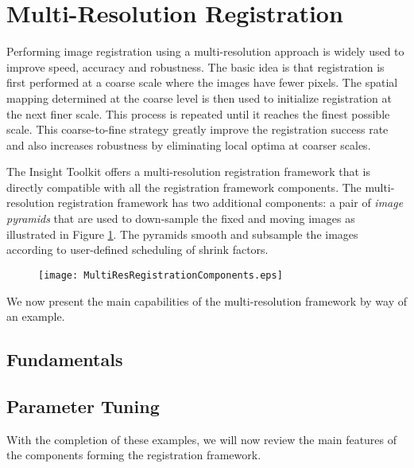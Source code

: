 \section{Multi-Resolution Registration}
\label{sec:MultiResolutionRegistration}
Performing image registration using a multi-resolution approach is widely used
to improve speed, accuracy and robustness. The basic idea is that registration
is first performed at a coarse scale where the images have fewer pixels.
The spatial mapping determined at the coarse level is then used to initialize
registration at the next finer scale. This process is repeated until it
reaches the finest possible scale. This coarse-to-fine strategy greatly
improve the registration success rate and also increases robustness
by eliminating local optima at coarser scales.

The Insight Toolkit offers a multi-resolution registration framework that is
directly compatible with all the registration framework components. The
multi-resolution registration framework has two additional components: a pair
of \emph{image pyramids} that are used to down-sample the fixed and moving
images as illustrated in Figure \ref{fig:MultiResRegistrationComponents}.
The pyramids smooth and subsample the images according to user-defined
scheduling of shrink factors.
 
\begin{figure}
\center
\texttt{[image: MultiResRegistrationComponents.eps]}
\label{fig:MultiResRegistrationComponents}
\end{figure}
 
We now present the main capabilities of the multi-resolution framework by
way of an example.

\subsection{Fundamentals}
\ifitkFullVersion

\fi

\subsection{Parameter Tuning}
\ifitkFullVersion

\fi

With the completion of these examples, we will now review the main
features of the components forming the registration framework.

